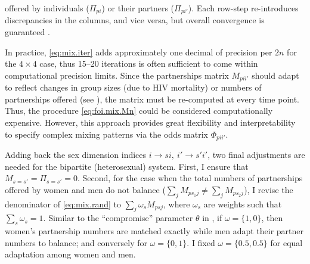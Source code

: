 offered by individuals ($\Pi_{pi}$) or their partners ($\Pi_{pi'}$).
Each row-step re-introduces discrepancies in the columns, and vice versa,
but overall convergence is guaranteed \cite{Sinkhorn1964}.
\par
In practice, \eqref{eq:mix.iter} adds approximately
one decimal of precision per $2n$ for the $4\times4$ case,
thus 15--20 iterations is often sufficient to come within computational precision limits.
Since the partnerships matrix $M_{pii'}$ should adapt to reflect changes in
group sizes (\eg due to HIV mortality) or numbers of partnerships offered (\eg see ),
the matrix must be re-computed at every time point.
Thus, the procedure \eqref{eq:foi.mix.Mn} could be considered computationally expensive.
However, this approach provides great flexibility and interpretability
to specify complex mixing patterns via the odds matrix $\Phi_{pii'}$.
\par
Adding back the sex dimension indices $i \rightarrow si, ~ i' \rightarrow s'i'$,
two final adjustments are needed for the bipartite (\ie heterosexual) system.
First, I ensure that $M_{s=s'} = \Pi_{s=s'} = 0$.
Second, for the case when the total numbers of partnerships offered by women and men
do not balance ($\sum_j M_{ps_{1}j} \ne \sum_j M_{ps_{2}j}$),
I revise the denominator of \eqref{eq:mix.rand} to $\sum_{j} \omega_s M_{psj}$,
where $\omega_s$ are weights such that $\sum_s \omega_s = 1$.
Similar to the ``compromise'' parameter $\theta$ in \cite{Garnett1994},
if $\omega = \{1,0\}$, then women's partnership numbers are matched exactly
while men adapt their partner numbers to balance;
and conversely for $\omega = \{0,1\}$.
I fixed $\omega = \{0.5,0.5\}$ for equal adaptation among women and men.
